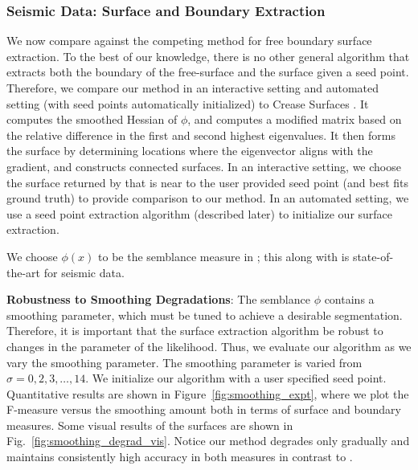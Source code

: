 \documentclass[10pt,journal,compsoc]{IEEEtran}
\newcommand{\comment}[1]{ }
\begin{document}
\subsubsection{Seismic Data: Surface and Boundary Extraction}

We now compare against the competing method for free boundary surface
extraction.  To the best of our knowledge, there is no other general
algorithm that extracts both the boundary of the free-surface and the
surface given a seed point. Therefore, we compare our method in an
interactive setting and automated setting (with seed points
automatically initialized) to Crease Surfaces
\cite{schultz2010crease}. It computes the smoothed Hessian of $\phi$,
and computes a modified matrix based on the relative difference in the
first and second highest eigenvalues. It then forms the surface by
determining locations where the eigenvector aligns with the gradient,
and constructs connected surfaces. In an interactive setting, we
choose the surface returned by \cite{schultz2010crease} that is near
to the user provided seed point (and best fits ground truth) to
provide comparison to our method. In an automated setting, we use a
seed point extraction algorithm (described later) to initialize our
surface extraction.

\comment{
\cite{schultz2010crease} returns all surfaces by detecting connected
components of maxima of the local surface likelihood map, which is
computed from $\phi$. It constructs a likelihood map from of the
eignevalues of the smoothed Hessian of $\phi$ at a pixel, and setting
the likelihood proportional to the relative difference in the first
and second highest eignevalues.
}

We choose $\phi(x)$ to be the semblance measure in
\cite{hale2013methods}; this along with \cite{schultz2010crease} is
state-of-the-art for seismic data.

{\bf Robustness to Smoothing Degradations}: The semblance $\phi$
contains a smoothing parameter, which must be tuned to achieve a
desirable segmentation. Therefore, it is important that the surface
extraction algorithm be robust to changes in the parameter of the
likelihood. Thus, we evaluate our algorithm as we vary the smoothing
parameter.  The smoothing parameter is varied from
$\sigma = 0, 2, 3, \ldots, 14$.  We initialize our algorithm with a
user specified seed point. Quantitative results are shown in
Figure~\ref{fig:smoothing_expt}, where we plot the F-measure versus
the smoothing amount both in terms of surface and boundary
measures. Some visual results of the surfaces are shown in
Fig.~\ref{fig:smoothing_degrad_vis}.  Notice our method degrades only
gradually and maintains consistently high accuracy in both measures in
contrast to \cite{schultz2010crease}.
\end{document}
